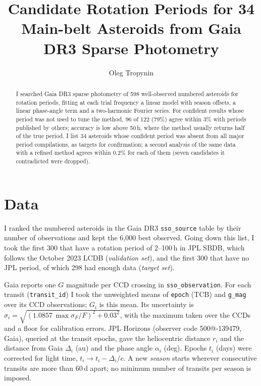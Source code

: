 \documentclass[RNAAS]{aastex631}
\begin{document}
\title{Candidate Rotation Periods for 34 Main-belt Asteroids from Gaia DR3 Sparse Photometry}

\author{Oleg Tropynin}

\begin{abstract}
I searched Gaia DR3 sparse photometry of 598 well-observed numbered asteroids for rotation periods,
fitting at each trial frequency a linear model with season offsets, a linear phase-angle term and a
two-harmonic Fourier series. For confident results whose period was not used to tune the method, 96 of
122 (79\%) agree within 3\% with periods published by others; accuracy is low above 50\,h, where the
method usually returns half of the true period. I list 34 asteroids whose confident period was absent
from all major period compilations, as targets for confirmation; a second analysis of the same data
with a refined method agrees within 0.2\% for each of them (seven candidates it contradicted were dropped).
\end{abstract}

\section{Data}

I ranked the numbered asteroids in the Gaia DR3 \texttt{sso\_source} table \citep{Tanga2023} by their
number of observations and kept the 6{,}000 best observed. Going down this list, I took the first 300
that have a rotation period of 2--100\,h in JPL SBDB, which follows the October 2023 LCDB
\citep{Warner2009} (\emph{validation set}), and the first 300 that have no JPL period, of which 298 had enough data (\emph{target set}).

Gaia reports one $G$ magnitude per CCD crossing in \texttt{sso\_observation}. For each transit
(\texttt{transit\_id}) I took the unweighted means of \texttt{epoch} (TCB) and \texttt{g\_mag} over its CCD
observations; $G_i$ is this mean. Its uncertainty is
$\sigma_i=\sqrt{(1.0857\,\max\sigma_F/F)^2+0.03^2}$, with the maximum taken over the CCDs and a floor for
calibration errors. JPL Horizons
(observer code 500@-139479, Gaia), queried at the transit epochs, gave the heliocentric distance $r_i$ and
the distance from Gaia $\Delta_i$ (au) and the phase angle $\alpha_i$ (deg). Epochs $t_i$ (days) were
corrected for light time, $t_i\to t_i-\Delta_i/c$. A new \emph{season} starts wherever consecutive transits
are more than 60\,d apart; no minimum number of transits per season is imposed.
\end{document}
